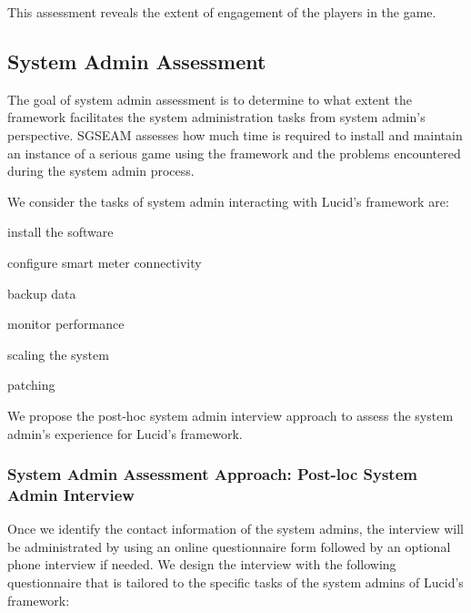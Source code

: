 \documentclass[11pt,oneside]{book}
\begin{document}
This assessment reveals the extent of engagement of the players in the game.

\subsection{System Admin Assessment}

The goal of system admin assessment is to determine to what extent the 
framework facilitates the system administration tasks from system admin's perspective. SGSEAM 
assesses how much time is required to install and maintain an instance of a serious game using the 
framework and the problems encountered  during the system admin process.

We consider the tasks of system admin interacting with Lucid's framework are:
\begin{compactenum}
    \item install the software
    \item configure smart meter connectivity
    \item backup data
    \item monitor performance
    \item scaling the system
    \item patching
\end{compactenum}

We propose the post-hoc system admin interview approach to assess the system admin's experience for Lucid's framework.

\subsubsection{System Admin Assessment Approach: Post-loc System Admin Interview}
\label{Post-hoc system admin interview}

Once we identify the contact information of the system admins, the interview will be administrated by using an online questionnaire form followed by an optional phone interview if needed. We design the interview with the following questionnaire that is tailored to the specific tasks of the system admins of Lucid's framework:
\end{document}
